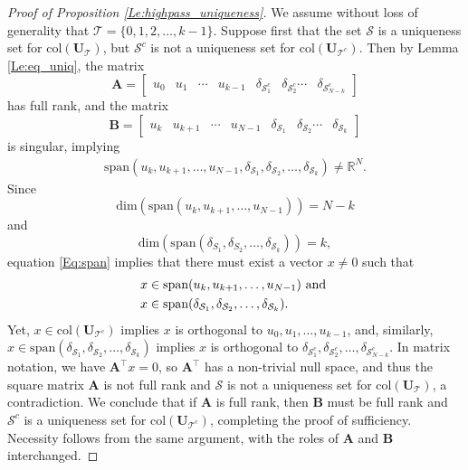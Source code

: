 \documentclass{article}
\begin{document}
\begin{proof}[Proof of Proposition \ref{Le:highpass_uniqueness}]
We assume without loss of generality that ${\mathcal T}=\{0,1,2,\ldots,k-1\}$. 
Suppose first that the set $\mathcal{S}$ is a uniqueness set for $\mbox{col}({\mathbf{U}}_{\mathcal T})$, but $\mathcal{S}^c$ is not a uniqueness set for $\mbox{col}({\mathbf{U}}_{{\mathcal T}^c})$. Then by Lemma \ref{Le:eq_uniq}, the matrix $$\mathbf{A}=
 \left[ \begin{array}{cccccccc}
u_{0} & u_{1} & \cdots & u_{k-1} & \delta_{{\mathcal{S}}^c_1} & \delta_{{\mathcal{S}}^c_2} \cdots & \delta_{{\mathcal{S}}^c_{N-k}} \end{array} \right]$$
has full rank, and the matrix $$\mathbf{B}=
 \left[ \begin{array}{cccccccc}
u_{k} & u_{k+1} & \cdots & u_{N-1} & \delta_{\mathcal{S}_{1}} & \delta_{\mathcal{S}_{2}} \cdots & \delta_{\mathcal{S}_k} \end{array} \right]$$
is singular, implying
\begin{align}\label{Eq:span}
\mbox{span}(u_{k}, u_{k+1},\ldots, u_{N-1}, \delta_{\mathcal{S}_{1}}, \delta_{\mathcal{S}_{2}}, \ldots, \delta_{\mathcal{S}_k}) \neq \mathbb{R}^N.
\end{align}
Since 
$$\mbox{dim}(\mbox{span}(u_{k}, u_{k+1},\ldots, u_{N-1}))=N-k$$ and $$\mbox{dim}(\mbox{span}(\delta_{S_{1}}, \delta_{S_{2}}, \ldots, \delta_{\mathcal{S}_k}))=k,$$ equation 
\eqref{Eq:span} implies that
there must exist a vector $x \neq 0$ such that 
\begin{align*}
&x \in  \mbox{span}(u_{k}, u_{k+1},\ldots, u_{N-1})  \hbox{ and } \\
& x \in \mbox{span}(\delta_{\mathcal{S}_{1}}, \delta_{\mathcal{S}_{2}}, \ldots, \delta_{\mathcal{S}_{k}}).\end{align*}
Yet, $x \in \mbox{col}({\mathbf{U}}_{{\mathcal T}^c})$ implies $x$ is orthogonal to  $u_0, u_1, \ldots, u_{k-1}$, and, similarly, 
$x \in \mbox{span}(\delta_{\mathcal{S}_{1}}, \delta_{\mathcal{S}_{2}}, \ldots, \delta_{\mathcal{S}_{k}})$ implies $x$ is orthogonal to $\delta_{\mathcal{S}^c_{1}}, \delta_{\mathcal{S}^c_{2}}, \ldots, \delta_{\mathcal{S}^c_{N-k}}.$
In matrix notation, we have $\mathbf{A}^{\top}x=0$, so $\mathbf{A}^{\top}$ has a non-trivial null space, and thus the square matrix $\mathbf{A}$ is not full rank and $\mathcal{S}$ is not a uniqueness set for $\mbox{col}({\mathbf{U}}_{\mathcal T})$, a contradiction. We conclude that if $\mathbf{A}$ is full rank, then $\mathbf{B}$ must be full rank and $\mathcal{S}^c$ is a uniqueness set for $\mbox{col}({\mathbf{U}}_{{\mathcal T}^c})$, completing the proof of sufficiency. Necessity follows from the same argument, with the roles of $\mathbf{A}$ and $\mathbf{B}$ interchanged.
\end{proof}
\end{document}
